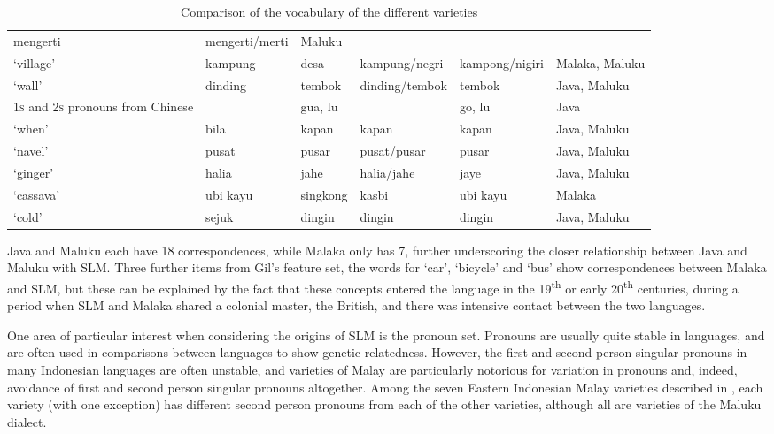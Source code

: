 \begin{sidewaystable}
\begin{tabular}{llllll}
mengerti &
mengerti/merti &
Maluku\\
`village' &
kampung &
desa &
kampung/negri &
kampong/nigiri &
Malaka, Maluku\\
`wall' &
dinding &
tembok &
dinding/tembok &
tembok &
Java, Maluku\\
1\textsc{s} and 2\textsc{s} pronouns from Chinese &
 &
gua, lu &
 &
go, lu &
Java\\
`when' &
bila &
kapan &
kapan &
kapan &
Java, Maluku\\
`navel' &
pusat &
pusar &
pusat/pusar &
pusar &
Java, Maluku\\
`ginger' &
halia &
jahe &
halia/jahe &
jaye &
Java, Maluku\\
`cassava' &
ubi kayu &
singkong &
kasbi &
ubi kayu &
Malaka\\
`cold' &
sejuk &
dingin &
dingin &
dingin &
Java, Maluku\\
\end{tabular}
\caption{Comparison of the vocabulary of the different varieties}
\label{paauw:tab:cognates}
\end{sidewaystable}

Java and Maluku each have 18 correspondences, while Malaka only has 7, further underscoring the closer relationship between Java and Maluku with SLM. Three further items from Gil's feature set, the words for `car', `bicycle' and `bus' show correspondences between Malaka and SLM, but these can be explained by the fact that these concepts entered the language in the 19\textsuperscript{th} or early 20\textsuperscript{th} centuries, during a period when SLM and Malaka shared a colonial master, the British, and there was intensive contact between the two languages.

One area of particular interest when considering the origins of SLM is the pronoun set. Pronouns are usually quite stable in languages, and are often used in comparisons between languages to show genetic relatedness. However, the first and second person singular pronouns in many Indonesian languages are often unstable, and varieties of Malay are particularly notorious for variation in pronouns and, indeed, avoidance of first and second person singular pronouns altogether. Among the seven Eastern Indonesian Malay varieties described in \citet{Paauw2008}, each variety (with one exception) has different second person pronouns from each of the other varieties, although all are varieties of the Maluku dialect.

